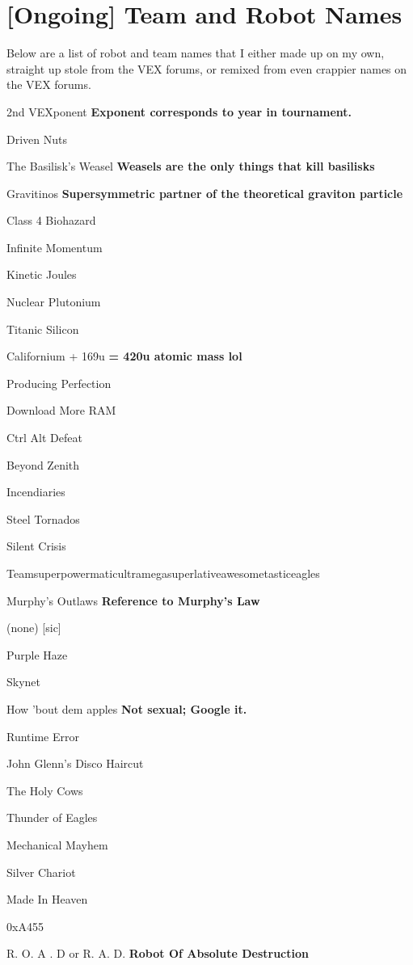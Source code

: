 \section{[Ongoing] Team and Robot Names}

Below are a list of robot and team names that I either made up on my own, straight up stole from the VEX forums, or remixed from even crappier names on the VEX forums.


2nd VEXponent \textbf{Exponent corresponds to year in tournament.}

Driven Nuts

The Basilisk’s Weasel \textbf{Weasels are the only things that kill basilisks}

Gravitinos \textbf{Supersymmetric partner of the theoretical graviton particle}

Class 4 Biohazard

Infinite Momentum

Kinetic Joules

Nuclear Plutonium

Titanic Silicon

Californium + 169u \textbf{= 420u atomic mass lol}

Producing Perfection

Download More RAM

Ctrl Alt Defeat

Beyond Zenith

Incendiaries

Steel Tornados

Silent Crisis

Teamsuperpowermaticultramegasuperlativeawesometasticeagles

Murphy’s Outlaws \textbf{Reference to Murphy's Law}

(none) [sic]

Purple Haze

Skynet

How 'bout dem apples \textbf{Not sexual; Google it.}

Runtime Error

John Glenn’s Disco Haircut

The Holy Cows

Thunder of Eagles

Mechanical Mayhem

Silver Chariot

Made In Heaven

0xA455

R. O. A . D  or R. A. D. \textbf{Robot Of Absolute Destruction}
